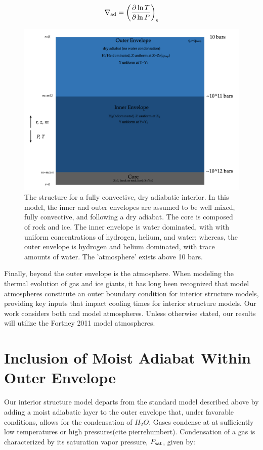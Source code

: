 \documentclass[11pt]{ucscthesisbs}
\begin{document}
\begin{equation}
\nabla_{\rm ad} = \left( \frac{\partial \ln T}{\partial \ln P} \right)_{\rm s}
\end{equation}

\begin{figure}[ht!]
 \centerline{
  \includegraphics[width=6.0in]{figures/structure_schematic_images/structure_schematic_images.001.png}
 }
\caption[A Standard Interior Structure Model]
{The structure for a fully convective, dry adiabatic interior. In this model, the inner and outer envelopes are assumed to be well mixed, fully convective, and following a dry adiabat. The core is composed of rock and ice. The inner envelope is water dominated, with with uniform concentrations of hydrogen, helium, and water; whereas, the outer envelope is hydrogen and helium dominated, with trace amounts of water. The 'atmosphere' exists above 10 bars.}
\label{fig:standard_dry_interior}
\end{figure}

Finally, beyond the outer envelope is the atmosphere. When modeling the thermal evolution of gas and ice giants, it has long been recognized that model atmospheres constitute an outer boundary condition for interior structure models, providing key inputs that impact cooling times for interior structure models. Our work considers both \citep{graboske_1975} and \citep{fortney_2011} model atmospheres. Unless otherwise stated, our results will utilize the Fortney 2011 model atmospheres. 

\section{Inclusion of Moist Adiabat Within Outer Envelope}
Our interior structure model departs from the standard model described above by adding a moist adiabatic layer to the outer envelope that, under favorable conditions, allows for the condensation of $H_{2}O$. Gases condense at at sufficiently low temperatures or high pressures(cite pierrehumbert). Condensation of a gas is characterized by its saturation vapor pressure, $P_{\rm sat}$, given by: 
\end{document}
